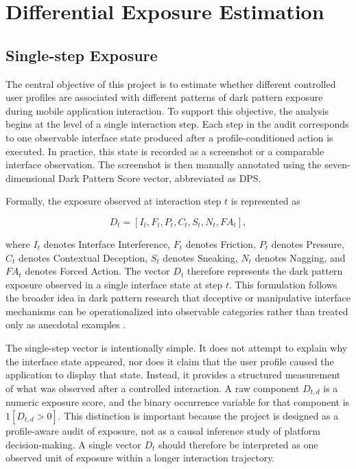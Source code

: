 \chapter{Differential Exposure Estimation}

\section{Single-step Exposure}

The central objective of this project is to estimate whether different controlled user profiles are associated with different patterns of dark pattern exposure during mobile application interaction. To support this objective, the analysis begins at the level of a single interaction step. Each step in the audit corresponds to one observable interface state produced after a profile-conditioned action is executed. In practice, this state is recorded as a screenshot or a comparable interface observation. The screenshot is then manually annotated using the seven-dimensional Dark Pattern Score vector, abbreviated as DPS.

Formally, the exposure observed at interaction step \(t\) is represented as

\[
D_t = [I_t, F_t, P_t, C_t, S_t, N_t, FA_t],
\]

where \(I_t\) denotes Interface Interference, \(F_t\) denotes Friction, \(P_t\) denotes Pressure, \(C_t\) denotes Contextual Deception, \(S_t\) denotes Sneaking, \(N_t\) denotes Nagging, and \(FA_t\) denotes Forced Action. The vector \(D_t\) therefore represents the dark pattern exposure observed in a single interface state at step \(t\). This formulation follows the broader idea in dark pattern research that deceptive or manipulative interface mechanisms can be operationalized into observable categories rather than treated only as anecdotal examples \cite{gray2018darkpatterns,mathur2019darkpatterns,mathur2021whatmakesdark}.

The single-step vector is intentionally simple. It does not attempt to explain why the interface state appeared, nor does it claim that the user profile caused the application to display that state. Instead, it provides a structured measurement of what was observed after a controlled interaction. A raw component \(D_{t,d}\) is a numeric exposure score, and the binary occurrence variable for that component is \(1[D_{t,d}>0]\). This distinction is important because the project is designed as a profile-aware audit of exposure, not as a causal inference study of platform decision-making. A single vector \(D_t\) should therefore be interpreted as one observed unit of exposure within a longer interaction trajectory.

